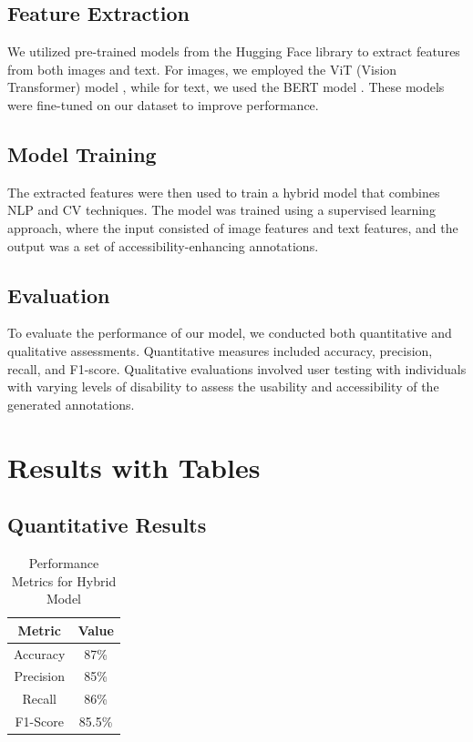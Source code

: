 \subsection{Feature Extraction}
We utilized pre-trained models from the Hugging Face library to extract features from both images and text. For images, we employed the ViT (Vision Transformer) model \cite{dosovitskiy2020an}, while for text, we used the BERT model \cite{devlin2019bert}. These models were fine-tuned on our dataset to improve performance.

\subsection{Model Training}
The extracted features were then used to train a hybrid model that combines NLP and CV techniques. The model was trained using a supervised learning approach, where the input consisted of image features and text features, and the output was a set of accessibility-enhancing annotations.

\subsection{Evaluation}
To evaluate the performance of our model, we conducted both quantitative and qualitative assessments. Quantitative measures included accuracy, precision, recall, and F1-score. Qualitative evaluations involved user testing with individuals with varying levels of disability to assess the usability and accessibility of the generated annotations.

\section{Results with Tables}
\subsection{Quantitative Results}
\begin{table}[ht]
\centering
\caption{Performance Metrics for Hybrid Model}
\begin{tabular}{|c|c|}
\hline
\textbf{Metric} & \textbf{Value} \\
\hline
Accuracy & 87\% \\
Precision & 85\% \\
Recall & 86\% \\
F1-Score & 85.5\% \\
\hline
\end{tabular}
\label{tab:results}
\end{table}

